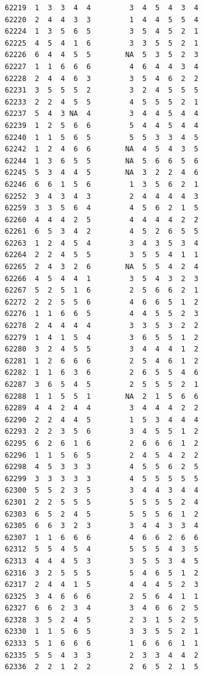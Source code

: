 \documentclass[
  letterpaper,
  DIV=11,
  numbers=noendperiod]{scrreprt}
\begin{document}
\begin{verbatim}
62219  1  3  3  4  4         3  4  5  4  3  4
62220  2  4  4  3  3         1  4  4  5  5  4
62224  1  3  5  6  5         3  5  4  5  2  1
62225  4  5  4  1  6         3  3  5  5  2  1
62226  6  4  4  5  5        NA  5  3  5  2  3
62227  1  1  6  6  6         4  6  4  4  3  4
62228  2  4  4  6  3         3  5  4  6  2  2
62231  3  5  5  5  2         3  2  4  5  5  5
62233  2  2  4  5  5         4  5  5  5  2  1
62237  5  4  3 NA  4         3  4  4  5  4  4
62239  1  2  5  6  6         5  4  4  5  4  4
62240  1  1  5  6  5         5  5  3  3  4  5
62242  1  2  4  6  6        NA  4  5  4  3  5
62244  1  3  6  5  5        NA  5  6  6  5  6
62245  5  3  4  4  5        NA  3  2  2  4  6
62246  6  6  1  5  6         1  3  5  6  2  1
62252  3  4  3  4  3         2  4  4  4  4  3
62259  3  3  5  6  4         4  5  6  2  1  5
62260  4  4  4  2  5         4  4  4  4  2  2
62261  6  5  3  4  2         4  5  2  6  5  5
62263  1  2  4  5  4         3  4  3  5  3  4
62264  2  2  4  5  5         3  5  5  4  1  1
62265  2  4  3  2  6        NA  5  5  4  2  4
62266  4  5  4  4  1         3  5  4  3  2  3
62267  5  2  5  1  6         2  5  6  6  2  1
62272  2  2  5  5  6         4  6  6  5  1  2
62276  1  1  6  6  5         4  4  5  5  2  3
62278  2  4  4  4  4         3  3  5  3  2  2
62279  1  4  1  5  4         3  6  5  5  1  2
62280  3  2  4  5  5         3  4  4  4  1  2
62281  1  2  6  6  6         2  5  4  6  1  2
62282  1  1  6  3  6         2  6  5  5  4  6
62287  3  6  5  4  5         2  5  5  5  2  1
62288  1  1  5  5  1        NA  2  1  5  6  6
62289  4  4  2  4  4         3  4  4  4  2  2
62290  2  2  4  4  5         1  5  3  4  4  4
62293  2  2  3  5  6         3  4  5  5  1  2
62295  6  2  6  1  6         2  6  6  6  1  2
62296  1  1  5  6  5         2  4  5  4  2  2
62298  4  5  3  3  3         4  5  5  6  2  5
62299  3  3  3  3  3         4  5  5  5  5  5
62300  5  5  2  3  5         3  4  4  3  4  4
62301  2  2  5  5  5         5  5  5  5  2  4
62303  6  5  2  4  5         5  5  5  6  1  2
62305  6  6  3  2  3         3  4  4  3  3  4
62307  1  1  6  6  6         4  6  6  2  6  6
62312  5  5  4  5  4         5  5  5  4  3  5
62313  4  4  4  5  3         3  5  5  3  4  5
62316  3  2  5  5  5         5  4  6  5  1  2
62317  2  4  4  1  5         4  4  4  5  2  3
62325  3  4  6  6  6         2  5  6  4  1  1
62327  6  6  2  3  4         3  4  6  6  2  5
62328  3  5  2  4  5         2  3  1  5  2  5
62330  1  1  5  6  5         3  3  5  5  2  1
62333  5  1  6  6  6         1  6  6  6  1  1
62335  5  5  4  3  3         2  3  3  4  4  2
62336  2  2  1  2  2         2  6  5  2  1  5

\end{verbatim}
\end{document}
